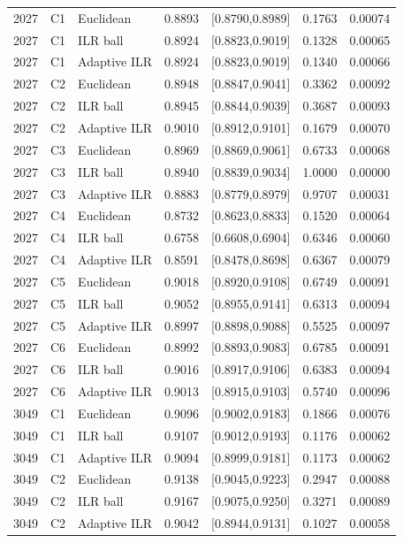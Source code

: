 \begin{longtable}{rrlrrrr}
2027 & C1 & Euclidean & 0.8893 & [0.8790,0.8989] & 0.1763 & 0.00074 \\
2027 & C1 & ILR ball & 0.8924 & [0.8823,0.9019] & 0.1328 & 0.00065 \\
2027 & C1 & Adaptive ILR & 0.8924 & [0.8823,0.9019] & 0.1340 & 0.00066 \\
2027 & C2 & Euclidean & 0.8948 & [0.8847,0.9041] & 0.3362 & 0.00092 \\
2027 & C2 & ILR ball & 0.8945 & [0.8844,0.9039] & 0.3687 & 0.00093 \\
2027 & C2 & Adaptive ILR & 0.9010 & [0.8912,0.9101] & 0.1679 & 0.00070 \\
2027 & C3 & Euclidean & 0.8969 & [0.8869,0.9061] & 0.6733 & 0.00068 \\
2027 & C3 & ILR ball & 0.8940 & [0.8839,0.9034] & 1.0000 & 0.00000 \\
2027 & C3 & Adaptive ILR & 0.8883 & [0.8779,0.8979] & 0.9707 & 0.00031 \\
2027 & C4 & Euclidean & 0.8732 & [0.8623,0.8833] & 0.1520 & 0.00064 \\
2027 & C4 & ILR ball & 0.6758 & [0.6608,0.6904] & 0.6346 & 0.00060 \\
2027 & C4 & Adaptive ILR & 0.8591 & [0.8478,0.8698] & 0.6367 & 0.00079 \\
2027 & C5 & Euclidean & 0.9018 & [0.8920,0.9108] & 0.6749 & 0.00091 \\
2027 & C5 & ILR ball & 0.9052 & [0.8955,0.9141] & 0.6313 & 0.00094 \\
2027 & C5 & Adaptive ILR & 0.8997 & [0.8898,0.9088] & 0.5525 & 0.00097 \\
2027 & C6 & Euclidean & 0.8992 & [0.8893,0.9083] & 0.6785 & 0.00091 \\
2027 & C6 & ILR ball & 0.9016 & [0.8917,0.9106] & 0.6383 & 0.00094 \\
2027 & C6 & Adaptive ILR & 0.9013 & [0.8915,0.9103] & 0.5740 & 0.00096 \\
3049 & C1 & Euclidean & 0.9096 & [0.9002,0.9183] & 0.1866 & 0.00076 \\
3049 & C1 & ILR ball & 0.9107 & [0.9012,0.9193] & 0.1176 & 0.00062 \\
3049 & C1 & Adaptive ILR & 0.9094 & [0.8999,0.9181] & 0.1173 & 0.00062 \\
3049 & C2 & Euclidean & 0.9138 & [0.9045,0.9223] & 0.2947 & 0.00088 \\
3049 & C2 & ILR ball & 0.9167 & [0.9075,0.9250] & 0.3271 & 0.00089 \\
3049 & C2 & Adaptive ILR & 0.9042 & [0.8944,0.9131] & 0.1027 & 0.00058 \\

\end{longtable}
